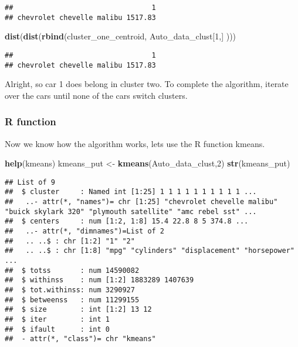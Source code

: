 \documentclass[11pt,]{article}
\newenvironment{Shaded}{\begin{snugshade}}{\end{snugshade}}
\newcommand{\DecValTok}[1]{\textcolor[rgb]{0.00,0.00,0.81}{#1}}
\newcommand{\KeywordTok}[1]{\textcolor[rgb]{0.13,0.29,0.53}{\textbf{#1}}}
\newcommand{\NormalTok}[1]{#1}
\newcommand{\StringTok}[1]{\textcolor[rgb]{0.31,0.60,0.02}{#1}}
\begin{document}
\begin{verbatim}
##                                 1
## chevrolet chevelle malibu 1517.83
\end{verbatim}

\begin{Shaded}
\begin{Highlighting}[]
\KeywordTok{dist}\NormalTok{(}\KeywordTok{dist}\NormalTok{(}\KeywordTok{rbind}\NormalTok{(cluster_one_centroid, Auto_data_clust[}\DecValTok{1}\NormalTok{,] )))}
\end{Highlighting}
\end{Shaded}

\begin{verbatim}
##                                 1
## chevrolet chevelle malibu 1517.83
\end{verbatim}

Alright, so car 1 does belong in cluster two. To complete the algorithm,
iterate over the cars until none of the cars switch clusters.

\hypertarget{r-function-1}{%
\subsubsection{R function}\label{r-function-1}}

Now we know how the algorithm works, lets use the R function kmeans.

\begin{Shaded}
\begin{Highlighting}[]
\KeywordTok{help}\NormalTok{(kmeans)}
\NormalTok{kmeans_put <-}\StringTok{ }\KeywordTok{kmeans}\NormalTok{(Auto_data_clust,}\DecValTok{2}\NormalTok{)}
\KeywordTok{str}\NormalTok{(kmeans_put)}
\end{Highlighting}
\end{Shaded}

\begin{verbatim}
## List of 9
##  $ cluster     : Named int [1:25] 1 1 1 1 1 1 1 1 1 1 ...
##   ..- attr(*, "names")= chr [1:25] "chevrolet chevelle malibu" "buick skylark 320" "plymouth satellite" "amc rebel sst" ...
##  $ centers     : num [1:2, 1:8] 15.4 22.8 8 5 374.8 ...
##   ..- attr(*, "dimnames")=List of 2
##   .. ..$ : chr [1:2] "1" "2"
##   .. ..$ : chr [1:8] "mpg" "cylinders" "displacement" "horsepower" ...
##  $ totss       : num 14590082
##  $ withinss    : num [1:2] 1883289 1407639
##  $ tot.withinss: num 3290927
##  $ betweenss   : num 11299155
##  $ size        : int [1:2] 13 12
##  $ iter        : int 1
##  $ ifault      : int 0
##  - attr(*, "class")= chr "kmeans"
\end{verbatim}
\end{document}
